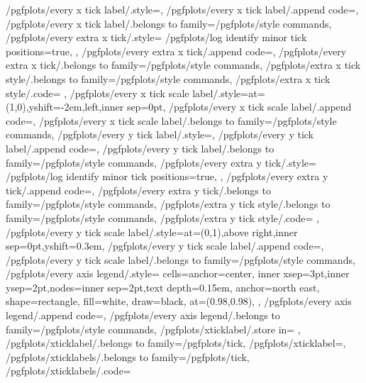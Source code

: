 {	/pgfplots/every x tick label/.style={},
	/pgfplots/every x tick label/.append code={},
	/pgfplots/every x tick label/.belongs to family=/pgfplots/style commands,
	/pgfplots/every extra x tick/.style={
		/pgfplots/log identify minor tick positions=true,
	},
	/pgfplots/every extra x tick/.append code={},
	/pgfplots/every extra x tick/.belongs to family=/pgfplots/style commands,
	/pgfplots/extra x tick style/.belongs to family=/pgfplots/style commands,
	/pgfplots/extra x tick style/.code={%
	},
	/pgfplots/every x tick scale label/.style={at={(1,0)},yshift=-2em,left,inner sep=0pt},
	/pgfplots/every x tick scale label/.append code={},
	/pgfplots/every x tick scale label/.belongs to family=/pgfplots/style commands,
	/pgfplots/every y tick label/.style={},
	/pgfplots/every y tick label/.append code={},
	/pgfplots/every y tick label/.belongs to family=/pgfplots/style commands,
	/pgfplots/every extra y tick/.style={
		/pgfplots/log identify minor tick positions=true,
	},
	/pgfplots/every extra y tick/.append code={},
	/pgfplots/every extra y tick/.belongs to family=/pgfplots/style commands,
	/pgfplots/extra y tick style/.belongs to family=/pgfplots/style commands,
	/pgfplots/extra y tick style/.code={%
	},
	/pgfplots/every y tick scale label/.style={at={(0,1)},above right,inner sep=0pt,yshift=0.3em},
	/pgfplots/every y tick scale label/.append code={},
	/pgfplots/every y tick scale label/.belongs to family=/pgfplots/style commands,
	/pgfplots/every axis legend/.style={%
		cells={anchor=center},
		inner xsep=3pt,inner ysep=2pt,nodes={inner sep=2pt,text depth=0.15em},
		anchor=north east,%
		shape=rectangle,%
		fill=white,%
		draw=black,
		at={(0.98,0.98)},
	},
	/pgfplots/every axis legend/.append code={},
	/pgfplots/every axis legend/.belongs to family=/pgfplots/style commands,
	/pgfplots/xticklabel/.store in=	\pgfplots@xticklabel,
	/pgfplots/xticklabel/.belongs to family=/pgfplots/tick,
	/pgfplots/xticklabel=,
	/pgfplots/xticklabels/.belongs to family=/pgfplots/tick,
	/pgfplots/xticklabels/.code={%
		\to\pgfplots@xticklabels
}}
